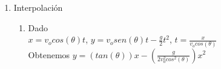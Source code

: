 \documentclass{article}
\begin{document}
\begin{enumerate}
\item Interpolación 
	\begin{enumerate}
	\renewcommand{\theenumii}{\arabic{enumii}}
	\addtocounter{enumii}{3}
	\item Dado\\
	$x=v_ocos(\theta)t$,   $y=v_osen(\theta)t-\frac{g}{2}t^2$,  $t=\frac{x}{v_ocos(\theta)}$\\
	Obtenemos
	$y=(tan(\theta))x-(\frac{g}{2v^2_0cos^2(\theta)})x^2$
	\end{enumerate}
\end{enumerate}
\end{document}
